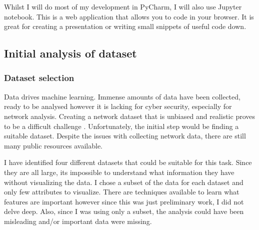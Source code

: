 \documentclass[11pt]{article}
\begin{document}
Whilst I will do most of my development in PyCharm, I will also use Jupyter notebook. This is a web application that allows you to code in your browser. It is great for creating a presentation or writing small snippets of useful code down. 

\subsection{Initial analysis of dataset}
\subsubsection{Dataset selection} \label{Dataset selection}
Data drives machine learning. Immense amounts of data have been collected, ready to be analysed however it is lacking for cyber security, especially for network analysis. Creating a network dataset that is unbiased and realistic proves to be a difficult challenge \cite{bg-dataset-selection}. Unfortunately, the initial step would be finding a suitable dataset. Despite the issues with collecting network data, there are still many public resources available. 

I have identified four different datasets that could be suitable for this task. Since they are all large, its impossible to understand what information they have without visualizing the data. I chose a subset of the data for each dataset and only few attributes to visualize. There are techniques available to learn what features are important however since this was just preliminary work, I did not delve deep. Also, since I was using only a subset, the analysis could have been misleading and/or important data were missing.
\end{document}
